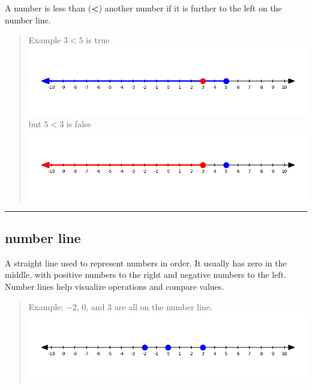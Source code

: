 \documentclass[
  letterpaper,
]{scrrept}
\begin{document}
A number is less than (\textbf{\textless{}}) another number if it is
further to the left on the number line.

\begin{quote}
Example \(3 < 5\) is true
\includegraphics[width=1\linewidth,height=\textheight,keepaspectratio]{images/Glossary/less_than_true.png}
but \(5 < 3\) is false
\includegraphics[width=1\linewidth,height=\textheight,keepaspectratio]{images/Glossary/less_than_false.png}
\end{quote}

\begin{center}\rule{0.5\linewidth}{0.5pt}\end{center}

\subsection*{number line}\label{glossary-number-line}

A straight line used to represent numbers in order. It usually has zero
in the middle, with positive numbers to the right and negative numbers
to the left. Number lines help visualize operations and compare values.

\begin{quote}
Example: \(-2\), \(0\), and \(3\) are all on the number line.
\includegraphics[width=1\linewidth,height=\textheight,keepaspectratio]{images/Glossary/number_line_example.png}
\end{quote}
\end{document}
